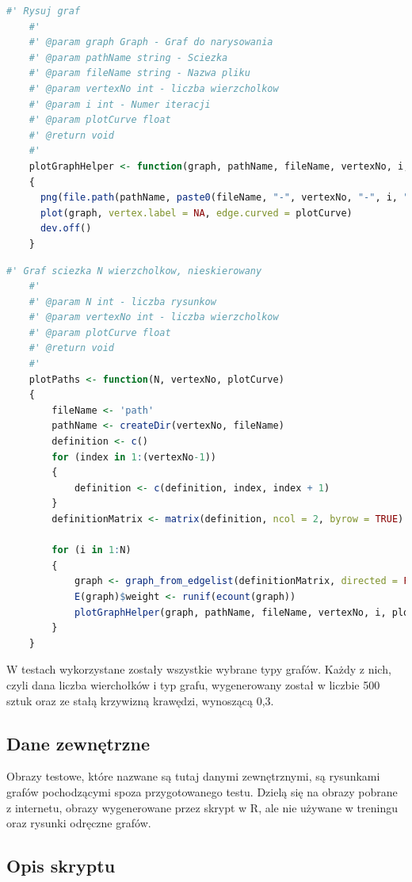 \begin{lstlisting}[language=R,caption=Listing skryptu rysującego grafy,label={tests-generation-1}]
	#' Rysuj graf
	#'
	#' @param graph Graph - Graf do narysowania
	#' @param pathName string - Sciezka
	#' @param fileName string - Nazwa pliku
	#' @param vertexNo int - liczba wierzcholkow
	#' @param i int - Numer iteracji
	#' @param plotCurve float
	#' @return void
	#'
	plotGraphHelper <- function(graph, pathName, fileName, vertexNo, i, plotCurve)
	{
	  png(file.path(pathName, paste0(fileName, "-", vertexNo, "-", i, ".png")), width = 800, height = 600)
	  plot(graph, vertex.label = NA, edge.curved = plotCurve)
	  dev.off()
	}
\end{lstlisting}

\begin{lstlisting}[language=R,caption=Listing funkcji tworzącej ścieżkę,label={tests-generation-2}]
	#' Graf sciezka N wierzcholkow, nieskierowany
	#'
	#' @param N int - liczba rysunkow
	#' @param vertexNo int - liczba wierzcholkow
	#' @param plotCurve float
	#' @return void
	#'
	plotPaths <- function(N, vertexNo, plotCurve)
	{
		fileName <- 'path'
		pathName <- createDir(vertexNo, fileName)
		definition <- c()
		for (index in 1:(vertexNo-1))
		{
			definition <- c(definition, index, index + 1)
		}
		definitionMatrix <- matrix(definition, ncol = 2, byrow = TRUE)
		
		for (i in 1:N)
		{
			graph <- graph_from_edgelist(definitionMatrix, directed = FALSE)
			E(graph)$weight <- runif(ecount(graph))
			plotGraphHelper(graph, pathName, fileName, vertexNo, i, plotCurve)
		}
	}
\end{lstlisting}

W testach wykorzystane zostały wszystkie wybrane typy grafów.
Każdy z nich, czyli dana liczba wierchołków i typ grafu, wygenerowany został w liczbie 500 sztuk
oraz ze stałą krzywizną krawędzi, wynoszącą 0,3. %

\subsection{Dane zewnętrzne}
Obrazy testowe, które nazwane są tutaj danymi zewnętrznymi, są rysunkami grafów pochodzącymi spoza przygotowanego testu.
Dzielą się na obrazy pobrane z internetu, obrazy wygenerowane przez skrypt w R, ale nie używane w treningu
oraz rysunki odręczne grafów.

\subsection{Opis skryptu}

